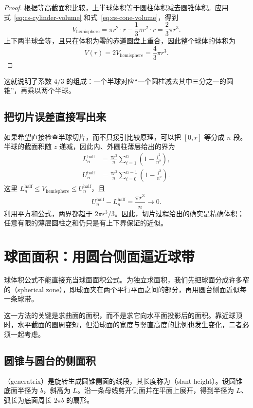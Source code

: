 \documentclass[UTF8]{ctexart}
\begin{document}
\begin{proof}
根据等高截面积比较，上半球体积等于圆柱体积减去圆锥体积。应用式~\eqref{eq:cs-cylinder-volume} 和式~\eqref{eq:cs-cone-volume}，得到
\[
  V_{\mathrm{hemisphere}}
  =\pi r^2\cdot r-\frac13\pi r^2\cdot r
  =\frac23\pi r^3.
\]
上下两半球全等，且只在体积为零的赤道圆盘上重合，因此整个球体的体积为
\[
  V(r)=2V_{\mathrm{hemisphere}}=\frac43\pi r^3.
\]
\end{proof}

这就说明了系数 $4/3$ 的组成：一个半球对应“一个圆柱减去其中三分之一的圆锥”，再乘以两个半球。

\subsection{把切片误差直接写出来}

如果希望直接检查半球切片，而不只援引比较原理，可以把 $[0,r]$ 等分成 $n$ 段。半球的截面积随 $z$ 递减，因此内、外圆柱薄层给出的界为
\begin{align*}
  L_n^{\mathrm{half}}
  &=\frac{\pi r^3}{n}\sum_{i=1}^{n}
    \left(1-\frac{i^2}{n^2}\right),\\
  U_n^{\mathrm{half}}
  &=\frac{\pi r^3}{n}\sum_{i=0}^{n-1}
    \left(1-\frac{i^2}{n^2}\right).
\end{align*}
这里 $L_n^{\mathrm{half}}\leq V_{\mathrm{hemisphere}}\leq U_n^{\mathrm{half}}$，且
\[
  U_n^{\mathrm{half}}-L_n^{\mathrm{half}}=\frac{\pi r^3}{n}\longrightarrow0.
\]
利用平方和公式，两界都趋于 $2\pi r^3/3$。因此，切片过程给出的确实是精确体积；任意有限的薄层圆柱之和仍只是有上下界保证的近似。

\section{球面面积：用圆台侧面逼近球带}
\label{sec:cs-sphere-area}

球体积公式不能直接充当球面面积公式。为独立求面积，我们先把球面分成许多窄的（spherical zone），即球面夹在两个平行平面之间的部分，再用圆台侧面近似每一条球带。

这一方法的关键是求曲面的面积，而不是求它向水平面投影后的面积。靠近球顶时，水平截面的圆周变短，但沿球面的宽度与竖直高度的比例也发生变化，二者必须一起考虑。

\subsection{圆锥与圆台的侧面积}

（generatrix）是旋转生成圆锥侧面的线段，其长度称为（slant height）。设圆锥底面半径为 $b$，斜高为 $L$。沿一条母线剪开侧面并在平面上展开，得到半径为 $L$、弧长为底面周长 $2\pi b$ 的扇形。
\end{document}
